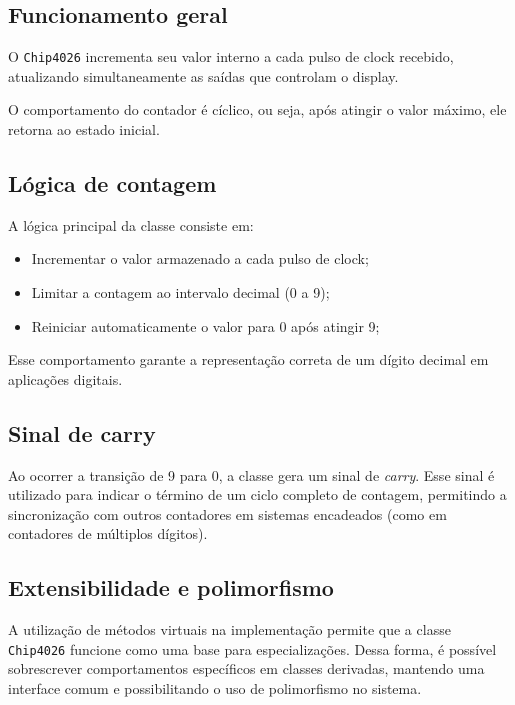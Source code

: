 \documentclass[12pt,a4paper]{article}
\begin{document}
\subsection{Funcionamento geral}

O \texttt{Chip4026} incrementa seu valor interno a cada pulso de clock recebido, atualizando simultaneamente as saídas que controlam o display.

O comportamento do contador é cíclico, ou seja, após atingir o valor máximo, ele retorna ao estado inicial.

\subsection{Lógica de contagem}

A lógica principal da classe consiste em:

\begin{itemize}
    \item Incrementar o valor armazenado a cada pulso de clock;
    \item Limitar a contagem ao intervalo decimal (0 a 9);
    \item Reiniciar automaticamente o valor para 0 após atingir 9;
\end{itemize}

Esse comportamento garante a representação correta de um dígito decimal em aplicações digitais.

\subsection{Sinal de carry}

Ao ocorrer a transição de 9 para 0, a classe gera um sinal de \textit{carry}. Esse sinal é utilizado para indicar o término de um ciclo completo de contagem, permitindo a sincronização com outros contadores em sistemas encadeados (como em contadores de múltiplos dígitos).

\subsection{Extensibilidade e polimorfismo}

A utilização de métodos virtuais na implementação permite que a classe \texttt{Chip4026} funcione como uma base para especializações. Dessa forma, é possível sobrescrever comportamentos específicos em classes derivadas, mantendo uma interface comum e possibilitando o uso de polimorfismo no sistema.
\end{document}

